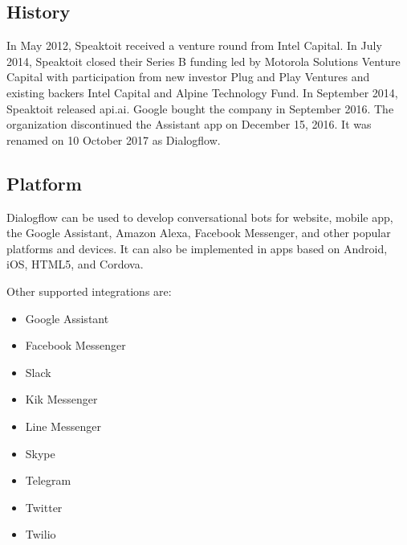 \subsection{History}

In May 2012, Speaktoit received a venture round from Intel Capital. 
In July 2014, Speaktoit closed their Series B funding led by Motorola Solutions Venture Capital with participation from new investor Plug and Play Ventures and existing backers Intel Capital and Alpine Technology Fund.
In September 2014, Speaktoit released api.ai.
Google bought the company in September 2016. 
The organization discontinued the Assistant app on December 15, 2016. 
It was renamed on 10 October 2017 as Dialogflow.

\subsection{Platform}

Dialogflow can be used to develop conversational bots for website, mobile app, the Google Assistant, Amazon Alexa, Facebook Messenger, and other popular platforms and devices. It can also be implemented in apps based on Android, iOS, HTML5, and Cordova.

Other supported integrations are:
\begin{itemize}

\item{Google Assistant}

\item{Facebook Messenger}

\item{Slack}

\item{Kik Messenger}

\item{Line Messenger}

\item{Skype}

\item{Telegram}

\item{Twitter}

\item{Twilio}
\end{itemize}

